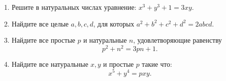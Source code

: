 \documentclass{article}
\begin{document}
\begin{enumerate}[label*=\protect\fbox{\arabic{enumi}}]
\item Решите в натуральных числах уравнение:  $x^3 + y^3 + 1 = 3xy$.

\item Найдите все целые $a, b, c, d$, для которых $a^2 +b^2 +c^2 +d^2 = 2abcd$.

\item Найдите все простые $p$ и натуральные $n$, удовлетворяющие равенству $$p^2 +n^2 =3pn+1.$$

\item Найдите все натуральные $x, y$ и простые $p$ такие что:
\[x^5 + y^4 = pxy.\]

\end{enumerate}
\end{document}
